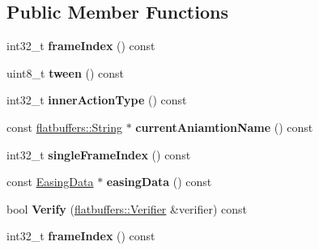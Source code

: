 \subsection*{Public Member Functions}
\begin{DoxyCompactItemize}
\item 
\mbox{\label{structflatbuffers_1_1InnerActionFrame_aa89822b21c01df3541c64f6d59589d53}} 
int32\+\_\+t {\bfseries frame\+Index} () const
\item 
\mbox{\label{structflatbuffers_1_1InnerActionFrame_a9dce8e85c641c1225e3e6c865c0ea0fa}} 
uint8\+\_\+t {\bfseries tween} () const
\item 
\mbox{\label{structflatbuffers_1_1InnerActionFrame_a3bc2cf3b3d1aeaa2f8ef95f2c0a7a369}} 
int32\+\_\+t {\bfseries inner\+Action\+Type} () const
\item 
\mbox{\label{structflatbuffers_1_1InnerActionFrame_aa9d63689b33341379530ea56447b55e7}} 
const \hyperlink{structflatbuffers_1_1String}{flatbuffers\+::\+String} $\ast$ {\bfseries current\+Aniamtion\+Name} () const
\item 
\mbox{\label{structflatbuffers_1_1InnerActionFrame_ab4c5020dcd71c02344f7c33b3cadcc02}} 
int32\+\_\+t {\bfseries single\+Frame\+Index} () const
\item 
\mbox{\label{structflatbuffers_1_1InnerActionFrame_ad4b83c87e0aff4b6ac3ffccad6eaac9f}} 
const \hyperlink{structflatbuffers_1_1EasingData}{Easing\+Data} $\ast$ {\bfseries easing\+Data} () const
\item 
\mbox{\label{structflatbuffers_1_1InnerActionFrame_a1dfeffb4075b7b84af4c4d60247d1b98}} 
bool {\bfseries Verify} (\hyperlink{classflatbuffers_1_1Verifier}{flatbuffers\+::\+Verifier} \&verifier) const
\item 
\mbox{\label{structflatbuffers_1_1InnerActionFrame_aa89822b21c01df3541c64f6d59589d53}} 
int32\+\_\+t {\bfseries frame\+Index} () const

\end{DoxyCompactItemize}
